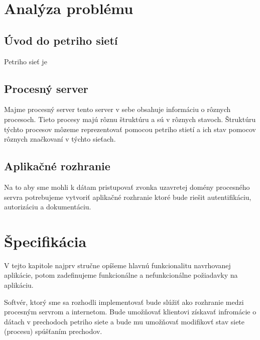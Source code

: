 

\section{Analýza problému}

\subsection{Úvod do petriho sietí} %
\noindent Petriho sieť je 


\subsection{Procesný server}
\noindent Majme procesný server tento server v sebe obsahuje informáciu o rôznych procesoch. Tieto procesy majú rôznu štruktúru a sú v rôznych stavoch. Štruktúru týchto procesov môzeme reprezentovať pomocou petriho stietí a ich stav pomocov rôznych značkovaní v týchto sieťach. 

\subsection{Aplikačné rozhranie}
\noindent Na to aby sme mohli k dátam pristupovať zvonka uzavretej domény procesného servra potrebujeme vytvoriť aplikačné rozhranie ktoré bude riešit autentifikáciu, autorizáciu a dokumentáciu. 




\section{Špecifikácia}
\noindent V tejto kapitole najprv stručne opíšeme hlavnú funkcionalitu navrhovanej aplikácie, potom zadefinujeme funkcionálne a nefunkcionálne požiadavky na aplikáciu.

Softvér, ktorý sme sa rozhodli implementovať bude slúžiť ako rozhranie medzi procesným servrom a internetom. Bude umožňovať klientovi získavať infromácie o dátach v prechodoch petriho siete a bude mu umožňovať modifikovť stav siete (procesu) spúšťaním prechodov. 

